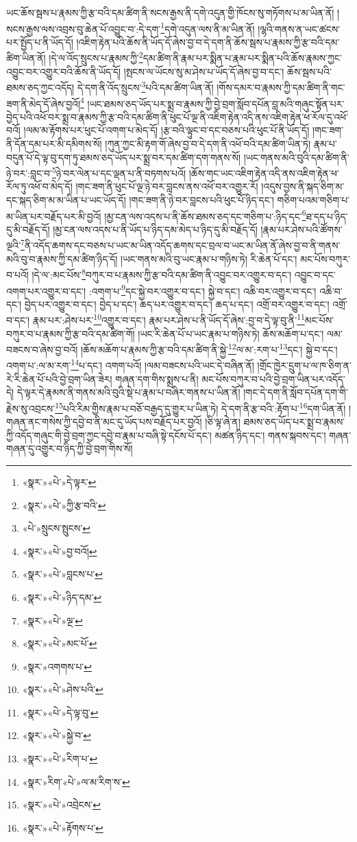 ཡང་ཆོས་སྦས་པ་རྣམས་ཀྱི་རྩ་བའི་དམ་ཚིག་ནི་སངས་རྒྱས་ནི་དགེ་འདུན་གྱི་ཁོངས་སུ་གཏོགས་པ་མ་ཡིན་ནོ། །སངས་རྒྱས་ལས་འབྲས་བུ་ཆེན་པོ་འབྱུང་བ་:དེ་དག་\footnote{«སྣར་»«པེ་»དེ་ལྟར་}དགེ་འདུན་ལས་ནི་མ་ཡིན་ནོ། །ལྷའི་གནས་ན་ཡང་ཚངས་པར་སྤྱོད་པ་ནི་ཡོད་དོ། །འཇིག་རྟེན་པའི་ཆོས་ནི་ཡོད་དོ་ཞེས་བྱ་བ་དེ་དག་ནི་ཆོས་སྦས་པ་རྣམས་ཀྱི་རྩ་བའི་དམ་ཚིག་ཡིན་ནོ། །དེ་ལ་འོད་སྲུངས་པ་རྣམས་ཀྱི་\footnote{«སྣར་»«པེ་»ཀྱི་རྩ་བའི་}དམ་ཚིག་ནི་རྣམ་པར་སྨིན་པ་རྣམ་པར་སྨིན་པའི་ཆོས་རྣམས་ཀྱང་འབྱུང་བར་འགྱུར་བའི་ཆོས་ནི་ཡོད་དོ། །སྤངས་ལ་ཡོངས་སུ་མ་ཤེས་པ་ཡོད་དོ་ཞེས་བྱ་བ་དང་། ཆོས་སྦས་པའི་ཐམས་ཅད་ཀྱང་འདོད། དེ་དག་ནི་འོད་སྲུངས་\footnote{«པེ་»སྲུངས་སྤུངས་}པའི་དམ་ཚིག་ཡིན་ནོ། །གོས་དམར་བ་རྣམས་ཀྱི་དམ་ཚིག་ནི་གང་ཟག་ནི་མེད་དོ་ཞེས་བྱའོ།\footnote{«སྣར་»«པེ་»བྱ་བའོ།} །ཡང་ཐམས་ཅད་ཡོད་པར་སྨྲ་བ་རྣམས་ཀྱི་བྱེ་བྲག་སློབ་དཔོན་བླ་མའི་གཞུང་སྟོན་པར་བྱེད་པའི་འཕོ་བར་སྨྲ་བ་རྣམས་ཀྱི་རྩ་བའི་དམ་ཚིག་ནི་ཕུང་པོ་ལྔ་ནི་འཇིག་རྟེན་འདི་ནས་འཇིག་རྟེན་ཕ་རོལ་དུ་འཕོ་བའོ། །ལམ་མ་རྟོགས་པར་ཕུང་པོ་འགག་པ་མེད་དོ། །རྩ་བའི་ལྟུང་བ་དང་བཅས་པའི་ཕུང་པོ་ནི་ཡོད་དོ། །གང་ཟག་ནི་དོན་དམ་པར་མི་དམིགས་སོ། །ཀུན་ཀྱང་མི་རྟག་གོ་ཞེས་བྱ་བ་དེ་དག་ནི་འཕོ་བའི་དམ་ཚིག་ཡིན་ཏེ། རྣམ་པ་བདུན་པོ་དེ་ལྟ་བུ་དག་ཏུ་ཐམས་ཅད་ཡོད་པར་སྨྲ་བར་དམ་ཚིག་དག་གནས་སོ། །ཡང་གནས་མའི་བུའི་དམ་ཚིག་ནི་ཉེ་བར་:བླང་བ་\footnote{«སྣར་»«པེ་»བླངས་པ་}ཉེ་བར་ལེན་པ་དང་ལྡན་པ་ནི་བཏགས་པའོ། །ཆོས་གང་ཡང་འཇིག་རྟེན་འདི་ནས་འཇིག་རྟེན་ཕ་རོལ་ཏུ་འཕོ་བ་མེད་དོ། །གང་ཟག་ནི་ཕུང་པོ་ལྔ་ཉེ་བར་བླངས་ནས་འཕོ་བར་འགྱུར་རོ། །འདུས་བྱས་ནི་སྐད་ཅིག་མ་དང་སྐད་ཅིག་མ་མ་ཡིན་པ་ཡང་ཡོད་དོ། །གང་ཟག་ནི་ཉེ་བར་བླངས་པའི་ཕུང་པོ་ཉིད་དང་། གཅིག་པའམ་གཅིག་པ་མ་ཡིན་པར་བརྗོད་པར་མི་བྱའོ། །མྱ་ངན་ལས་འདས་པ་ནི་ཆོས་ཐམས་ཅད་དང་གཅིག་པ་:ཉིད་དང་\footnote{«སྣར་»«པེ་»ཉིད་དམ་}ཐ་དད་པ་ཉིད་དུ་མི་བརྗོད་དོ། །མྱ་ངན་ལས་འདས་པ་ནི་ཡོད་པ་ཉིད་དམ་མེད་པ་ཉིད་དུ་མི་བརྗོད་དོ། །རྣམ་པར་ཤེས་པའི་ཚོགས་ལྔའི་\footnote{«སྣར་»«པེ་»ལྔ་}ནི་འདོད་ཆགས་དང་བཅས་པ་ཡང་མ་ཡིན་འདོད་ཆགས་དང་བྲལ་བ་ཡང་མ་ཡིན་ནོ་ཞེས་བྱ་བ་ནི་གནས་མའི་བུ་བ་རྣམས་ཀྱི་དམ་ཚིག་ཉིད་དོ། །ཡང་གནས་མའི་བུ་ཡང་རྣམ་པ་གཉིས་ཏེ། རི་ཆེན་པོ་དང་། མང་པོས་བཀུར་བ་པའོ། །དེ་ལ་:མང་པོས་\footnote{«སྣར་»«པེ་»མང་པོ་}བཀུར་བ་པ་རྣམས་ཀྱི་རྩ་བའི་དམ་ཚིག་ནི་འབྱུང་བར་འགྱུར་བ་དང་། འབྱུང་བ་དང་འགག་པར་འགྱུར་བ་དང་། :འགག་པ་\footnote{«སྣར་»འགགས་པ་}དང་སྐྱེ་བར་འགྱུར་བ་དང་། སྐྱེ་བ་དང་། འཆི་བར་འགྱུར་བ་དང་། འཆི་བ་དང་། བྱེད་པར་འགྱུར་བ་དང་། བྱེད་པ་དང་། ཆད་པར་འགྱུར་བ་དང་། ཆད་པ་དང་། འགྲོ་བར་འགྱུར་བ་དང་། འགྲོ་བ་དང་། རྣམ་པར་:ཤེས་པར་\footnote{«སྣར་»«པེ་»ཤེས་པའི་}འགྱུར་བ་དང་། རྣམ་པར་ཤེས་པ་ནི་ཡོད་དོ་ཞེས་:བྱ་བ་དེ་ལྟ་བུ་ནི་\footnote{«སྣར་»«པེ་»དེ་ལྟ་བུ་}མང་པོས་བཀུར་བ་པ་རྣམས་ཀྱི་རྩ་བའི་དམ་ཚིག་གོ། །ཡང་རི་ཆེན་པོ་པ་ཡང་རྣམ་པ་གཉིས་ཏེ། ཆོས་མཆོག་པ་དང་། ལམ་བཟངས་བ་ཞེས་བྱ་བའོ། །ཆོས་མཆོག་པ་རྣམས་ཀྱི་རྩ་བའི་དམ་ཚིག་ནི་སྐྱེ་\footnote{«སྣར་»«པེ་»སྐྱེ་བ་}ལ་མ་:རག་པ་\footnote{«སྣར་»«པེ་»རིག་པ་}དང་། སྐྱེ་བ་དང་། འགག་པ་:ལ་མ་རག་\footnote{«སྣར་»རིག་«པེ་»ལ་མ་རིག་ས་}པ་དང་། འགག་པའོ། །ལམ་བཟངས་པའི་ཡང་དེ་བཞིན་ནོ། །གྲོང་ཁྱེར་དྲུག་པ་ལ་ཁ་ཅིག་ན་རེ་རི་ཆེན་པོ་པའི་བྱེ་བྲག་ཡིན་ཟེར། གཞན་དག་གིས་སྨྲས་པ་ནི། མང་པོས་བཀུར་བ་པའི་བྱེ་བྲག་ཡིན་པར་འདོད་དེ། དེ་ལྟར་དེ་རྣམས་ནི་གནས་མའི་བུའི་སྡེ་པ་རྣམ་པ་བཞིར་གནས་པ་ཡིན་ནོ། །གང་དེ་དག་ནི་སློབ་དཔོན་དག་གི་རྗེས་སུ་འབྲངས་\footnote{«སྣར་»«པེ་»འབྲེངས་}པའི་རིམ་གྱིས་རྣམ་པ་བཅོ་བརྒྱད་དུ་གྱུར་པ་ཡིན་ཏེ། དེ་དག་ནི་རྩ་བའི་:རྟོག་པ་\footnote{«སྣར་»«པེ་»རྟོགས་པ་}དག་ཡིན་ནོ། །གཞན་ནང་གསེས་ཀྱི་དབྱེ་བ་ནི་མང་དུ་ཡོད་པས་བརྗོད་པར་བྱའོ། །ཅི་ལྟ་ཞེ་ན། ཐམས་ཅད་ཡོད་པར་སྨྲ་བ་རྣམས་ཀྱི་འདོད་གཞུང་གི་བྱེ་བྲག་ཀྱང་དབྱེ་བ་རྣམ་པ་བཞི་སྟེ་དངོས་པོ་དང་། མཚན་ཉིད་དང་། གནས་སྐབས་དང་། གཞན་གཞན་དུ་འགྱུར་བ་ཉིད་ཀྱི་བྱེ་བྲག་གིས་སོ། 